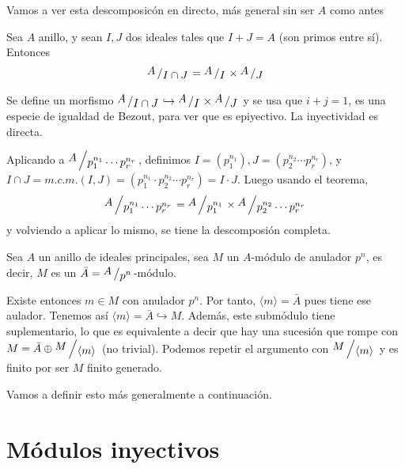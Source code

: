 Vamos a ver esta descomposic\'on en directo, m\'as general sin ser $A$ como antes
\begin{teo}
     Sea $A$ anillo, y sean $I,J$ dos ideales tales que $I+J=A$ (son primos entre s\'i). Entonces 
    $$\modulo{A}{I\cap J} = \modulo{A}{I} \times \modulo{A}{J}$$
\end{teo}
\begin{dem}
    Se define un morfismo $\modulo{A}{I\cap J} \hookrightarrow \modulo{A}{I} \times \modulo{A}{J}$ y se usa que $i+j=1$, es una especie de igualdad de Bezout, para ver que es epiyectivo. La inyectividad es directa. 
\end{dem}
\begin{cor}
    Aplicando a $\modulo{A}{p_1^{n_1} \cdots p_r^{n_r}}$, definimos $I=(p_1^{n_1}), J=(p_2^{n_2}\cdots p_r^{n_r})$, y $I\cap J = m.c.m.(I,J) = (p_1^{n_1} \cdot p_2^{n_2}\cdots p_r^{n_r}) = I\cdot J$. Luego usando el teorema, 
    $$\modulo{A}{p_1^{n_1} \cdots p_r^{n_r}} =\modulo{A}{p_1^{n_1}} \times \modulo{A}{p_2^{n_2} \cdots p_r^{n_r}}$$
    y volviendo a aplicar lo mismo, se tiene la descomposi\'on completa. 
\end{cor}
\begin{obs}
    
Sea $A$ un anillo de ideales principales, sea $M$ un $A$-m\'odulo de anulador $p^n$, es decir, $M$ es un $\bar A = \modulo{A}{p^n}$-m\'odulo. 

Existe entonces $m \in M$ con anulador $p^n$. Por tanto, $\langle m \rangle = \bar A$ pues tiene ese aulador. Tenemos as\'i $\langle m \rangle =\bar A \hookrightarrow M$. Adem\'as, este subm\'odulo tiene suplementario, lo que es equivalente a decir que hay una sucesi\'on que rompe con $M = \bar A \oplus \modulo{M}{\langle m \rangle }$ (no trivial). Podemos repetir el argumento con $ \modulo{M}{\langle m \rangle }$ y es finito por ser $M$ finito generado.

Vamos a definir esto m\'as generalmente a continuaci\'on.
\end{obs}
\section{M\'odulos inyectivos}


